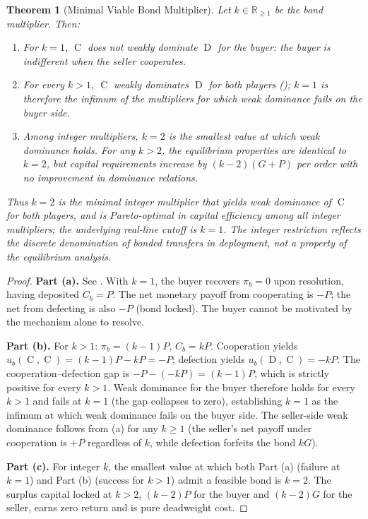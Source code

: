 \documentclass[11pt,a4paper]{article}
\newtheorem{theorem}{Theorem}[section]
\theoremstyle{definition}
\theoremstyle{remark}
\newcommand{\pay}{P}           %
\newcommand{\cumval}{G}        %
\newcommand{\bbond}{C_b}       %
\newcommand{\bpay}{\pi_b}      %
\newcommand{\ub}{u_b}          %
\DeclareMathOperator{\Coop}{C}
\DeclareMathOperator{\Def}{D}
\begin{document}
\begin{theorem}[Minimal Viable Bond Multiplier]
\label{thm:2x-sufficient}
Let $k \in \mathbb{R}_{\geq 1}$ be the bond multiplier. Then:
\begin{enumerate}[label=(\alph*)]
  \item For $k = 1$, $\Coop$ does not weakly dominate $\Def$ for the
    buyer: the buyer is indifferent when the seller cooperates.
  \item For every $k > 1$, $\Coop$ weakly dominates $\Def$ for both
    players (); $k = 1$ is therefore the
    infimum of the multipliers for which weak dominance fails on the
    buyer side.
  \item Among integer multipliers, $k = 2$ is the smallest value at
    which weak dominance holds. For any $k > 2$, the equilibrium
    properties are identical to $k = 2$, but capital requirements
    increase by $(k - 2)(\cumval + \pay)$ per order with no
    improvement in dominance relations.
\end{enumerate}
Thus $k = 2$ is the minimal \emph{integer} multiplier that yields
weak dominance of $\Coop$ for both players, and is Pareto-optimal in
capital efficiency among all integer multipliers; the underlying
real-line cutoff is $k = 1$. The integer restriction reflects the
discrete denomination of bonded transfers in deployment,
not a property of the equilibrium analysis.
\end{theorem}

\begin{proof}
\textbf{Part (a).} See . With $k = 1$, the buyer
recovers $\bpay = 0$ upon resolution, having deposited $\bbond = \pay$.
The net monetary payoff from cooperating is $-\pay$; the net from
defecting is also $-\pay$ (bond locked). The buyer cannot be motivated
by the mechanism alone to resolve.

\textbf{Part (b).} For $k > 1$: $\bpay = (k-1)\pay$, $\bbond = k\pay$.
Cooperation yields $\ub(\Coop, \Coop) = (k-1)\pay - k\pay = -\pay$;
defection yields $\ub(\Def, \Coop) = -k\pay$. The cooperation--defection
gap is $-\pay - (-k\pay) = (k-1)\pay$, which is strictly positive for
every $k > 1$. Weak dominance for the buyer therefore holds for every
$k > 1$ and fails at $k = 1$ (the gap collapses to zero), establishing
$k = 1$ as the infimum at which weak dominance fails on the buyer
side. The seller-side weak dominance follows from
(a) for any $k \geq 1$ (the seller's net
payoff under cooperation is $+\pay$ regardless of $k$, while
defection forfeits the bond $k\cumval$).

\textbf{Part (c).} For integer $k$, the smallest value at which
both Part (a) (failure at $k=1$) and Part (b) (success for $k > 1$)
admit a feasible bond is $k = 2$. The surplus capital locked at
$k > 2$, $(k - 2)\pay$ for the buyer and $(k - 2)\cumval$ for the
seller, earns zero return and is pure deadweight cost.
\end{proof}
\end{document}
